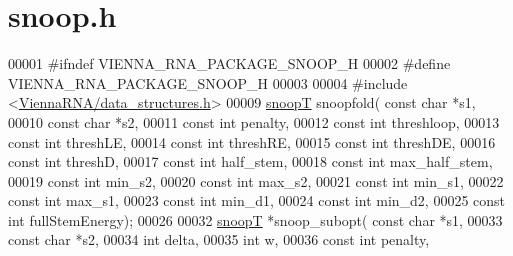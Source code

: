 \hypertarget{snoop_8h_source}{\section{snoop.\+h}
\label{snoop_8h_source}
}

\begin{DoxyCode}
00001 \textcolor{preprocessor}{#ifndef VIENNA\_RNA\_PACKAGE\_SNOOP\_H}
00002 \textcolor{preprocessor}{#define VIENNA\_RNA\_PACKAGE\_SNOOP\_H}
00003 
00004 \textcolor{preprocessor}{#include <\hyperlink{data__structures_8h}{ViennaRNA/data\_structures.h}>}
00009 \hyperlink{group__data__structures_structsnoopT}{snoopT} snoopfold( \textcolor{keyword}{const} \textcolor{keywordtype}{char} *s1,
00010                   \textcolor{keyword}{const} \textcolor{keywordtype}{char} *s2, 
00011                   \textcolor{keyword}{const} \textcolor{keywordtype}{int} penalty,
00012                   \textcolor{keyword}{const} \textcolor{keywordtype}{int} threshloop, 
00013                   \textcolor{keyword}{const} \textcolor{keywordtype}{int} threshLE,
00014                   \textcolor{keyword}{const} \textcolor{keywordtype}{int} threshRE,
00015                   \textcolor{keyword}{const} \textcolor{keywordtype}{int} threshDE,
00016                   \textcolor{keyword}{const} \textcolor{keywordtype}{int} threshD,
00017                   \textcolor{keyword}{const} \textcolor{keywordtype}{int} half\_stem,
00018                   \textcolor{keyword}{const} \textcolor{keywordtype}{int} max\_half\_stem,
00019                   \textcolor{keyword}{const} \textcolor{keywordtype}{int} min\_s2,
00020                   \textcolor{keyword}{const} \textcolor{keywordtype}{int} max\_s2,
00021                   \textcolor{keyword}{const} \textcolor{keywordtype}{int} min\_s1,
00022                   \textcolor{keyword}{const} \textcolor{keywordtype}{int} max\_s1,
00023                   \textcolor{keyword}{const} \textcolor{keywordtype}{int} min\_d1,
00024                   \textcolor{keyword}{const} \textcolor{keywordtype}{int} min\_d2,
00025       \textcolor{keyword}{const} \textcolor{keywordtype}{int} fullStemEnergy);
00026 
00032 \hyperlink{group__data__structures_structsnoopT}{snoopT} *snoop\_subopt( \textcolor{keyword}{const} \textcolor{keywordtype}{char} *s1,
00033                       \textcolor{keyword}{const} \textcolor{keywordtype}{char} *s2,
00034                       \textcolor{keywordtype}{int} delta,
00035                       \textcolor{keywordtype}{int} w,
00036                       \textcolor{keyword}{const} \textcolor{keywordtype}{int} penalty,

\end{DoxyCode}
